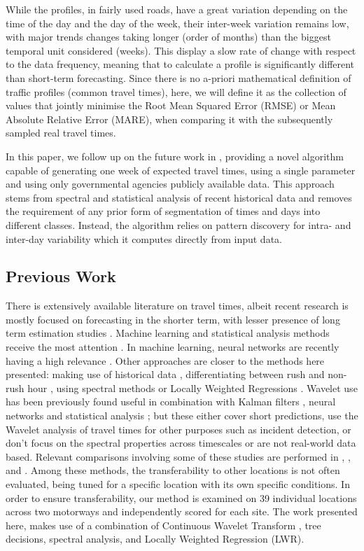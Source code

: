 \documentclass[a4paper, 10pt, conference]{ieeeconf}      %
\begin{document}
While the profiles, in fairly used roads, have a great variation depending on the time of the day and the day of the week, their inter-week variation remains low, with major trends changes taking longer (order of months) than the biggest temporal unit considered (weeks). 
This display a slow rate of change with respect to the data frequency, meaning that to calculate a profile is significantly different than short-term forecasting.
Since there is no a-priori mathematical definition of traffic profiles (common travel times), here, we will define it as the collection of values that jointly minimise the Root Mean Squared Error (RMSE) or Mean Absolute Relative Error (MARE), when comparing it with the subsequently sampled real travel times.

In this paper, we follow up on the future work in \cite{ttprofiles}, providing a novel algorithm capable of generating one week of expected travel times, using a single parameter and using only governmental agencies publicly available data.
This approach stems from spectral and statistical analysis of recent historical data and removes the requirement of any prior form of segmentation of times and days into different classes. 
Instead, the algorithm relies on pattern discovery for intra- and inter-day variability which it computes directly from input data.
\subsection{Previous Work} \label{Previous Work}
There is extensively available literature on travel times, albeit recent research is mostly focused on forecasting in the shorter term, with lesser presence of long term estimation studies \cite{long-term} \cite{long-term-2}. 
Machine learning and statistical analysis methods receive the most attention \cite{should}. In machine learning, neural networks are recently having a high relevance \cite{NN} \cite{spectral2}.
Other approaches are closer to the methods here presented: making use of historical data \cite{simple} \cite{dynamic-historic}, differentiating between rush and non-rush hour \cite{peak-historic}, using spectral methods \cite{spectral1} or Locally Weighted Regressions \cite{williams} \cite{sun} \cite{zhong} \cite{chowdhury} \cite{acqua} \cite{vana}.
Wavelet use has been previously found useful in combination with Kalman filters \cite{nonlinear}, neural networks \cite{samant} \cite{ghosh} \cite{hojjat} \cite{adeli} and statistical analysis \cite{basu} \cite{hang}; but these either cover short predictions, use the Wavelet analysis of travel times for other purposes such as incident detection, or don't focus on the spectral properties across timescales or are not real-world data based.
Relevant comparisons involving some of these studies are performed in \cite{nikovski}, \cite{lint}, \cite{mori} and \cite{ser}. 
Among these methods, the transferability to other locations is not often evaluated, being tuned for a specific location with its own specific conditions.
In order to ensure transferability, our method is examined on 39 individual locations across two motorways and independently scored for each site.
The work presented here, makes use of a combination of Continuous Wavelet Transform \cite{morletwavelet}, tree decisions, spectral analysis, and Locally Weighted Regression (LWR).
\end{document}
